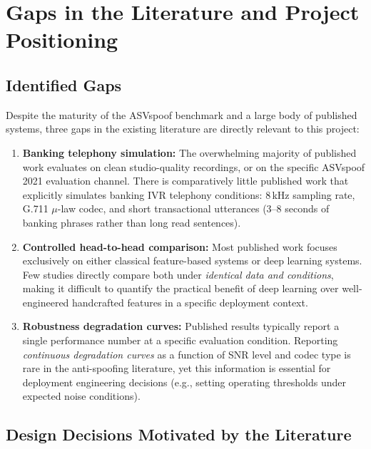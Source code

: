 \documentclass[12pt,a4paper]{article}
\begin{document}
\section{Gaps in the Literature and Project Positioning}

\subsection{Identified Gaps}

Despite the maturity of the ASVspoof benchmark and a large body of published systems,
three gaps in the existing literature are directly relevant to this project:

\begin{enumerate}
  \item \textbf{Banking telephony simulation:} The overwhelming majority of published
    work evaluates on clean studio-quality recordings, or on the specific ASVspoof 2021
    evaluation channel. There is comparatively little published work that explicitly
    simulates banking IVR telephony conditions: 8\,kHz sampling rate, G.711 $\mu$-law
    codec, and short transactional utterances (3--8 seconds of banking phrases rather
    than long read sentences).

  \item \textbf{Controlled head-to-head comparison:} Most published work focuses
    exclusively on either classical feature-based systems or deep learning systems.
    Few studies directly compare both under \emph{identical data and conditions}, making
    it difficult to quantify the practical benefit of deep learning over well-engineered
    handcrafted features in a specific deployment context.

  \item \textbf{Robustness degradation curves:} Published results typically report a
    single performance number at a specific evaluation condition. Reporting \emph{continuous
    degradation curves} as a function of SNR level and codec type is rare in the
    anti-spoofing literature, yet this information is essential for deployment engineering
    decisions (e.g., setting operating thresholds under expected noise conditions).
\end{enumerate}

\subsection{Design Decisions Motivated by the Literature}
\end{document}
